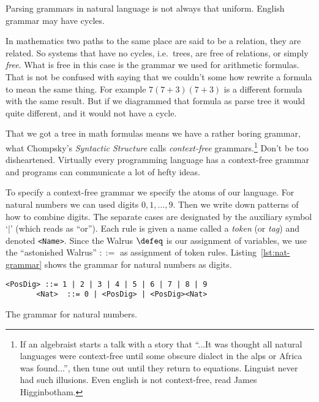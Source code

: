 Parsing grammars in natural language is not always that
uniform.  English grammar may have cycles.
\begin{center}
\end{center}
In mathematics two paths to the same place are said to be a relation, 
they are related.  So systems that have no cycles, i.e.\ trees, are 
free of relations, or simply \emph{free}.  What is free in this case 
is the grammar we used for arithmetic formulas.  That is not be confused 
with saying that we couldn't some how rewrite a formula to mean the same thing.
For example $7(7+3)(7+3)$ is a different formula with the same result.
But if we diagrammed that formula as parse tree it would quite different,
and it would not have a cycle.

That we got a tree in math formulas means we have a rather boring grammar, 
what Chompsky's \emph{Syntactic Structure} calls
\emph{context-free} grammars.\footnote{
    If an algebraist starts a talk with a story that ``...It was thought  all natural 
    languages were context-free until some obscure dialect in the alps or Africa was found...'', 
    then tune out until they return to equations.  
    Linguist never had such illusions. Even english is not context-free, read  James Higginbotham.} 
Don't be too disheartened.  Virtually every programming language has a 
context-free grammar and programs can communicate a lot of hefty ideas. 

To specify a context-free grammar we specify the atoms of our language. For
natural numbers we can used digits $0,1,\ldots, 9$.  Then we write down patterns
of how to combine digits.  The separate cases are designated by the auxiliary
symbol `$|$' (which reads as ``or'').  Each rule is given a name called a
\emph{token} (or \emph{tag}) and denoted \lstinline{<Name>}. Since the Walrus
$\defeq$ is our assignment of variables, we use the ``astonished Walrus'' $::=$
as assignment of token rules. Listing~\ref{lst:nat-grammar} shows the grammar
for natural numbers as digits.
\begin{lstfloat}
\begin{lstlisting}[mathescape]
     <PosDig> ::= 1 | 2 | 3 | 4 | 5 | 6 | 7 | 8 | 9 
       <Nat>  ::= 0 | <PosDig> | <PosDig><Nat>
\end{lstlisting}
\caption{The grammar for natural numbers.}
\label{lst:nat-grammar}
\end{lstfloat}

